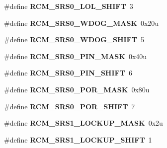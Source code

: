 \begin{DoxyCompactItemize}
\item 
\mbox{\label{group___r_c_m___register___masks_ga95ccd3811dd00bd56b397939db9b248d}} 
\#define {\bfseries R\+C\+M\+\_\+\+S\+R\+S0\+\_\+\+L\+O\+L\+\_\+\+S\+H\+I\+FT}~3
\item 
\mbox{\label{group___r_c_m___register___masks_gad203634bcb298bf54a3d5cce5c378a7e}} 
\#define {\bfseries R\+C\+M\+\_\+\+S\+R\+S0\+\_\+\+W\+D\+O\+G\+\_\+\+M\+A\+SK}~0x20u
\item 
\mbox{\label{group___r_c_m___register___masks_gac989a90d61cdfb7e612c212a3f6d06d8}} 
\#define {\bfseries R\+C\+M\+\_\+\+S\+R\+S0\+\_\+\+W\+D\+O\+G\+\_\+\+S\+H\+I\+FT}~5
\item 
\mbox{\label{group___r_c_m___register___masks_gab94707d2e91618c8c803dfa2d8df4e7b}} 
\#define {\bfseries R\+C\+M\+\_\+\+S\+R\+S0\+\_\+\+P\+I\+N\+\_\+\+M\+A\+SK}~0x40u
\item 
\mbox{\label{group___r_c_m___register___masks_ga1c1ae6946300c9f33bf5575d45d2b862}} 
\#define {\bfseries R\+C\+M\+\_\+\+S\+R\+S0\+\_\+\+P\+I\+N\+\_\+\+S\+H\+I\+FT}~6
\item 
\mbox{\label{group___r_c_m___register___masks_gad172e7645b5b6a0c5a2ff91db3087f7e}} 
\#define {\bfseries R\+C\+M\+\_\+\+S\+R\+S0\+\_\+\+P\+O\+R\+\_\+\+M\+A\+SK}~0x80u
\item 
\mbox{\label{group___r_c_m___register___masks_ga98b995f8d56d338b315d6750072474ff}} 
\#define {\bfseries R\+C\+M\+\_\+\+S\+R\+S0\+\_\+\+P\+O\+R\+\_\+\+S\+H\+I\+FT}~7
\item 
\mbox{\label{group___r_c_m___register___masks_ga4f7c4ce64c13c55fc0c7aaea3a702a03}} 
\#define {\bfseries R\+C\+M\+\_\+\+S\+R\+S1\+\_\+\+L\+O\+C\+K\+U\+P\+\_\+\+M\+A\+SK}~0x2u
\item 
\mbox{\label{group___r_c_m___register___masks_ga71f857503a2b2d2e0c30d4762e89a8d8}} 
\#define {\bfseries R\+C\+M\+\_\+\+S\+R\+S1\+\_\+\+L\+O\+C\+K\+U\+P\+\_\+\+S\+H\+I\+FT}~1

\end{DoxyCompactItemize}
